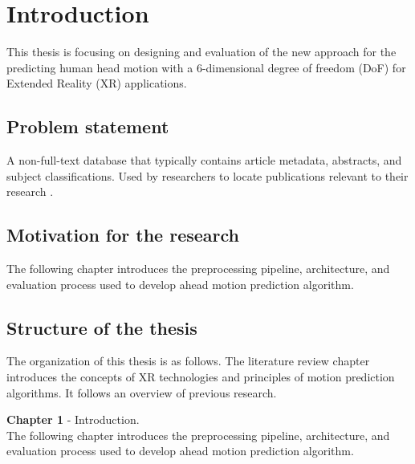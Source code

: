 \chapter{Introduction}
\label{sec:intro}
This thesis is focusing on designing and evaluation of the new approach for the predicting human head motion with a 6-dimensional degree of freedom (DoF) for Extended Reality (XR) applications. 


\section{Problem statement}
\label{sec:intro:problem}
A non-full-text database that typically contains article metadata, abstracts, and subject classifications. Used by researchers to locate publications relevant to their research \cite{chirico:smart_card}.

\section{Motivation for the research}
\label{sec:intro:motivation}
The following chapter introduces the preprocessing pipeline, architecture, and evaluation process used to develop ahead motion prediction algorithm.


\section{Structure of the thesis}
\label{sec:intro:structure}
The organization of this thesis is as follows. The literature review chapter introduces the concepts of XR technologies and principles of motion prediction algorithms. It follows an overview of previous research. 

\textbf{Chapter 1} - Introduction.\\
The following chapter introduces the preprocessing pipeline, architecture, and evaluation process used to develop ahead motion prediction algorithm.




